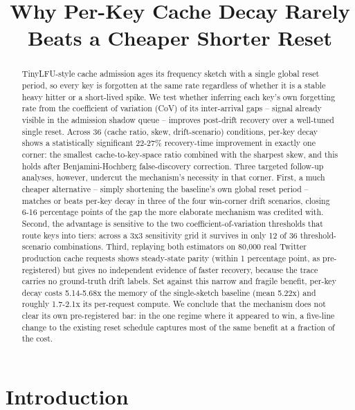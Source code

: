 \documentclass[11pt,letterpaper]{article}
\title{Why Per-Key Cache Decay Rarely Beats a Cheaper Shorter Reset}
\author{}
\date{}
\begin{document}
\maketitle

\begin{abstract}
TinyLFU-style cache admission ages its frequency sketch with a single global reset period, so every key is forgotten at the same rate regardless of whether it is a stable heavy hitter or a short-lived spike. We test whether inferring each key's own forgetting rate from the coefficient of variation (CoV) of its inter-arrival gaps -- signal already visible in the admission shadow queue -- improves post-drift recovery over a well-tuned single reset. Across 36 (cache ratio, skew, drift-scenario) conditions, per-key decay shows a statistically significant 22-27\% recovery-time improvement in exactly one corner: the smallest cache-to-key-space ratio combined with the sharpest skew, and this holds after Benjamini-Hochberg false-discovery correction. Three targeted follow-up analyses, however, undercut the mechanism's necessity in that corner. First, a much cheaper alternative -- simply shortening the baseline's own global reset period -- matches or beats per-key decay in three of the four win-corner drift scenarios, closing 6-16 percentage points of the gap the more elaborate mechanism was credited with. Second, the advantage is sensitive to the two coefficient-of-variation thresholds that route keys into tiers: across a 3x3 sensitivity grid it survives in only 12 of 36 threshold-scenario combinations. Third, replaying both estimators on 80,000 real Twitter production cache requests shows steady-state parity (within 1 percentage point, as pre-registered) but gives no independent evidence of faster recovery, because the trace carries no ground-truth drift labels. Set against this narrow and fragile benefit, per-key decay costs 5.14-5.68x the memory of the single-sketch baseline (mean 5.22x) and roughly 1.7-2.1x its per-request compute. We conclude that the mechanism does not clear its own pre-registered bar: in the one regime where it appeared to win, a five-line change to the existing reset schedule captures most of the same benefit at a fraction of the cost.
\end{abstract}

\section{Introduction}
\end{document}
